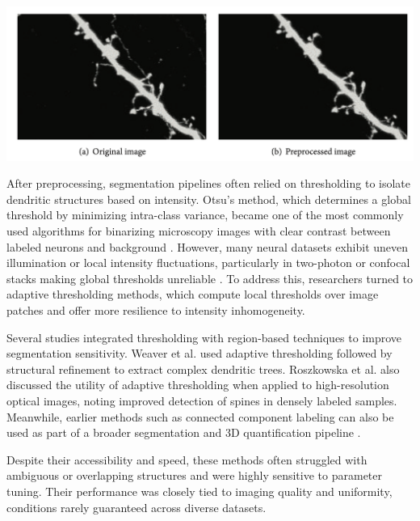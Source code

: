 \begin{center}
    \includegraphics[width=.9\textwidth]{figures/06_preprocessing.png} 
    \label{fig:preprocessing}
\end{center}


After preprocessing, segmentation pipelines often relied on thresholding to isolate dendritic structures based on intensity. Otsu’s method, which determines a global threshold by minimizing intra-class variance, became one of the most commonly used algorithms for binarizing microscopy images with clear contrast between labeled neurons and background \cite{Otsu_1979}. However, many neural datasets exhibit uneven illumination or local intensity fluctuations, particularly in two-photon or confocal stacks making global thresholds unreliable \cite{Wang_2015}. To address this, researchers turned to adaptive thresholding methods, which compute local thresholds over image patches and offer more resilience to intensity inhomogeneity.

Several studies integrated thresholding with region-based techniques to improve segmentation sensitivity. Weaver et al. \cite{Weaver_2004} used adaptive thresholding followed by structural refinement to extract complex dendritic trees. Roszkowska et al. \cite{Roszkowska_2016} also discussed the utility of adaptive thresholding when applied to high-resolution optical images, noting improved detection of spines in densely labeled samples. Meanwhile, earlier methods such as connected component labeling can also be used as part of a broader segmentation and 3D quantification pipeline \cite{Basu_2018}.

Despite their accessibility and speed, these methods often struggled with ambiguous or overlapping structures and were highly sensitive to parameter tuning. Their performance was closely tied to imaging quality and uniformity, conditions rarely guaranteed across diverse datasets.


